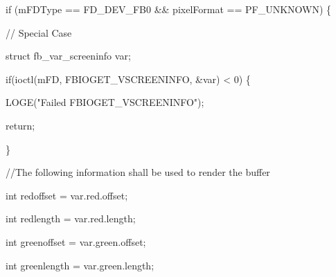 \begin{DoxyPre}		if (mFDType == FD\_DEV\_FB0 \&\& pixelFormat == PF\_UNKNOWN) \{\end{DoxyPre}



\begin{DoxyPre}			// Special Case\end{DoxyPre}



\begin{DoxyPre}			struct fb\_var\_screeninfo var;\end{DoxyPre}



\begin{DoxyPre}			if(ioctl(mFD, FBIOGET\_VSCREENINFO, &var) < 0) \{\end{DoxyPre}



\begin{DoxyPre}				LOGE("Failed FBIOGET\_VSCREENINFO");\end{DoxyPre}



\begin{DoxyPre}				return;\end{DoxyPre}



\begin{DoxyPre}			\}\end{DoxyPre}



\begin{DoxyPre}			//The following information shall be used to render the buffer\end{DoxyPre}



\begin{DoxyPre}			int redoffset = var.red.offset;\end{DoxyPre}



\begin{DoxyPre}			int redlength = var.red.length;\end{DoxyPre}



\begin{DoxyPre}			int greenoffset = var.green.offset;\end{DoxyPre}



\begin{DoxyPre}			int greenlength = var.green.length;\end{DoxyPre}



